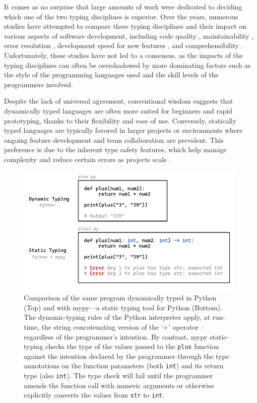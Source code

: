 It comes as no surprise that large amounts of work were dedicated to deciding which one of the two typing disciplines is superior. Over the years, numerous studies have attempted to compare these typing disciplines and their impact on various aspects of software development, including code quality \cite{Ray2017-gq, Gao2017-xn}, maintainability \cite{Kleinschmager2012-bg}, error resolution \cite{Prechelt1998-pd}, development speed for new features \cite{Prechelt2000-bf, Mayer2012-ko}, and comprehensibility \cite{Endrikat2014-uz}. Unfortunately, these studies have not led to a consensus, as the impacts of the typing disciplines can often be overshadowed by more dominating factors such as the style of the programming languages used and the skill levels of the programmers involved.

Despite the lack of universal agreement, conventional wisdom suggests that dynamically typed languages are often more suited for beginners and rapid prototyping, thanks to their flexibility and ease of use. Conversely, statically typed languages are typically favored in larger projects or environments where ongoing feature development and team collaboration are prevalent. This preference is due to the inherent type safety features, which help manage complexity and reduce certain errors as projects scale \cite{Chatley2019-uq}.


\begin{figure}[htbp]
  \centering
  \includegraphics[width=\linewidth]{TypedVsUntyped.pdf}
  \caption[Comparison of the same program dynamically typed in Python and with mypy—a static typing tool for Python]{
    \label{fig:typed-vs-untyped}
    Comparison of the same program dynamically typed in Python (Top) and with mypy—a static typing tool for Python (Bottom).  The dynamic-typing rules of the Python interpreter apply, at run-time, the string concatenating version of the `+' operator -- regardless of the programmer's intention.  By contrast, mypy static-typing checks the type of the values passed to the {\tt plus} function against the intention declared by the programmer through the type annotations on the function parameters (both {\tt int}) and its return type (also {\tt int}).  The type check will fail until the programmer amends the function call with numeric arguments or otherwise explicitly converts the values from {\tt str} to {\tt int}.
    }
\end{figure}



